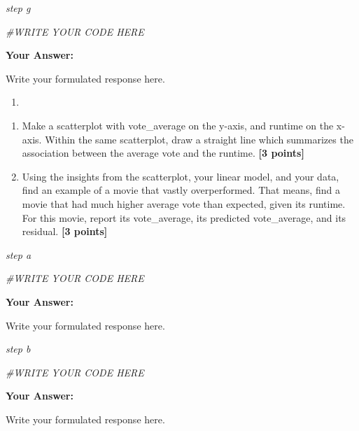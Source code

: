 \documentclass[
]{article}
\newenvironment{Shaded}{\begin{snugshade}}{\end{snugshade}}
\newcommand{\CommentTok}[1]{\textcolor[rgb]{0.56,0.35,0.01}{\textit{#1}}}
\providecommand{\tightlist}{%
  \setlength{\itemsep}{0pt}\setlength{\parskip}{0pt}}
\begin{document}
\emph{step g}

\begin{Shaded}
\begin{Highlighting}[]
\CommentTok{\#WRITE YOUR CODE HERE}
\end{Highlighting}
\end{Shaded}

\textbf{Your Answer:}

Write your formulated response here.

\begin{enumerate}
\def\labelenumi{\arabic{enumi}.}
\setcounter{enumi}{1}
\tightlist
\item
\end{enumerate}

\begin{enumerate}
\def\labelenumi{\alph{enumi}.}
\tightlist
\item
  Make a scatterplot with vote\_average on the y-axis, and runtime on
  the x-axis. Within the same scatterplot, draw a straight line which
  summarizes the association between the average vote and the runtime.
  \textbf{[3 points]}
\item
  Using the insights from the scatterplot, your linear model, and your
  data, find an example of a movie that vastly overperformed. That
  means, find a movie that had much higher average vote than expected,
  given its runtime. For this movie, report its vote\_average, its
  predicted vote\_average, and its residual. \textbf{[3 points]}
\end{enumerate}

\emph{step a}

\begin{Shaded}
\begin{Highlighting}[]
\CommentTok{\#WRITE YOUR CODE HERE}
\end{Highlighting}
\end{Shaded}

\textbf{Your Answer:}

Write your formulated response here.

\emph{step b}

\begin{Shaded}
\begin{Highlighting}[]
\CommentTok{\#WRITE YOUR CODE HERE}
\end{Highlighting}
\end{Shaded}

\textbf{Your Answer:}

Write your formulated response here.
\end{document}

